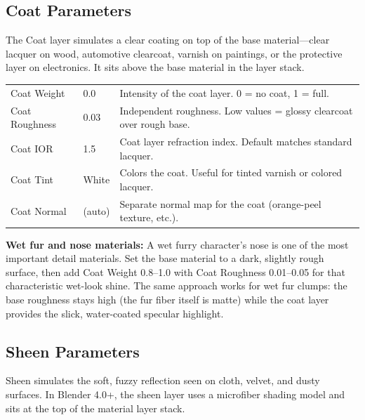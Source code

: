\subsection{Coat Parameters}
\label{sec:shading:principled:coat}

The Coat layer simulates a clear coating on top of the base
material---clear lacquer on wood, automotive clearcoat, varnish on
paintings, or the protective layer on electronics. It sits above the
base material in the layer stack.

\begin{center}
\begin{tabularx}{\textwidth}{L{3.5cm}C{2.5cm}X}
\toprule
{}
 &  &  \\
\midrule
Coat Weight & 0.0 & Intensity of the coat layer. 0 = no coat, 1 = full. \\
Coat Roughness & 0.03 & Independent roughness. Low values = glossy clearcoat over rough base. \\
Coat IOR & 1.5 & Coat layer refraction index. Default matches standard lacquer. \\
Coat Tint & White & Colors the coat. Useful for tinted varnish or colored lacquer. \\
Coat Normal & (auto) & Separate normal map for the coat (orange-peel texture, etc.). \\
\bottomrule
\end{tabularx}
\end{center}

\begin{furrybox}
\textbf{Wet fur and nose materials:} A wet furry character's nose
is one of the most important detail materials. Set the base material
to a dark, slightly rough surface, then add Coat Weight 0.8--1.0
with Coat Roughness 0.01--0.05 for that characteristic wet-look
shine. The same approach works for wet fur clumps: the base
roughness stays high (the fur fiber itself is matte) while the coat
layer provides the slick, water-coated specular highlight.
\end{furrybox}

\subsection{Sheen Parameters}
\label{sec:shading:principled:sheen}

Sheen simulates the soft, fuzzy reflection seen on cloth, velvet,
and dusty surfaces. In Blender 4.0+, the sheen layer uses a
microfiber shading model and sits at the top of the material layer
stack.

